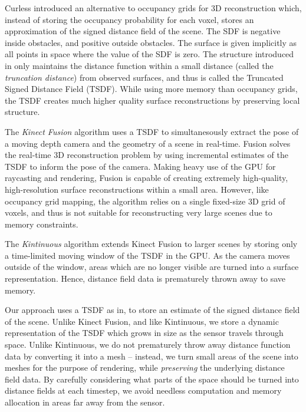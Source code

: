 \documentclass[10pt,twocolumn,letterpaper]{article}
\begin{document}
Curless \cite{Curless1996} introduced an alternative to occupancy grids for 3D
reconstruction which, instead of storing the occupancy probability for each
voxel, stores an approximation of the signed distance field of the scene.  The
SDF is negative inside obstacles, and positive outside obstacles. The surface
is given implicitly as all points in space where the value of the SDF is zero.
The structure introduced in \cite{Curless1996} only maintains the distance
function within a small distance (called the \emph{truncation distance}) from
observed surfaces, and thus is called the Truncated Signed Distance Field
(TSDF).  While using more memory than occupancy grids, the TSDF creates much
higher quality surface reconstructions by preserving local structure.

The \emph{Kinect Fusion} \cite{Newcombe} algorithm uses a TSDF to
simultanesously extract the pose of a moving depth camera and the geometry of a
scene in real-time. Fusion solves the real-time 3D reconstruction problem
by using incremental estimates of the TSDF to inform the pose of the camera.
Making heavy use of the GPU for raycasting and rendering, Fusion is
capable of creating extremely high-quality, high-resolution surface 
reconstructions within a small area. However, like occupancy grid mapping, the
algorithm relies on a single fixed-size 3D grid of voxels, and thus is not
suitable for reconstructing very large scenes due to memory constraints.

The \emph{Kintinuous} \cite{Whelan2013} algorithm extends Kinect Fusion to
larger scenes by storing only a time-limited moving window of the TSDF in the
GPU. As the camera moves outside of the window, areas which are no longer
visible are turned into a surface representation. Hence, distance field data is
prematurely thrown away to save memory.

Our approach uses a TSDF as in\cite{Curless1996,Newcombe,Whelan2013,Bylow2013},
to store an estimate of the signed distance field of the scene. Unlike Kinect
Fusion, and like Kintinuous, we store a dynamic representation of the TSDF
which grows in size as the sensor travels through space. Unlike Kintinuous, we
do not prematurely throw away distance function data by converting it into a
mesh -- instead, we turn small areas of the scene into meshes for the purpose
of rendering, while \textit{preserving} the underlying distance field data. By
carefully considering what parts of the space should be turned into distance
fields at each timestep, we avoid needless computation and memory allocation in
areas far away from the sensor. 
\end{document}
